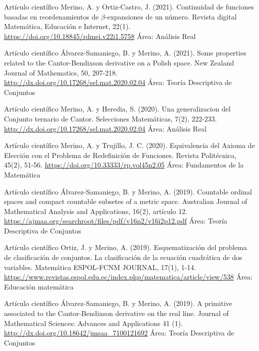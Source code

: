 \documentclass[
	a4paper,
	maincolor=cvblue!70!blue,
	sidecolor=gray!30,
	sectioncolor=cvblue!70!blue,
    sidebarwidth=7.5cm,
	topbottommargin=20pt,
	leftrightmargin=20pt,
]{fortysecondscv}
\begin{document}
    {Artículo científico}
    {Merino, A. y Ortiz-Castro, J. (2021). Continuidad de funciones basadas en reordenamientos de $\beta$-expansiones de un número. Revista digital Matemática, Educación e Internet, 22(1).}     
    {\url{https://doi.org/10.18845/rdmei.v22i1.5758}}
    {Área: Análisis Real}
    
    {Artículo científico}
    {Álvarez-Samaniego, B. y Merino, A. (2021). Some properties related to the Cantor-Bendixson derivative on a Polish space. New Zealand Journal of Mathematics, 50, 207-218.}     {\url{http://dx.doi.org/10.17268/sel.mat.2020.02.04}}
    {Área: Teoría Descriptiva de Conjuntos}
    
    {Artículo científico}
    {Merino, A. y Heredia, S. (2020). Una generalizacion del Conjunto ternario de Cantor. Selecciones Matemáticas, 7(2), 222-233.}     {\url{http://dx.doi.org/10.17268/sel.mat.2020.02.04}}
    {Área: Análisis Real}
    
    {Artículo científico}
    {Merino, A. y Trujillo, J. C. (2020). Equivalencia del Axioma de Elección con el Problema de Redefinición de Funciones. Revista Politécnica, 45(2), 51-56.}     {\url{https://doi.org/10.33333/rp.vol45n2.05}}
    {Área: Fundamentos de la Matemática}
    
    {Artículo científico}
    {Álvarez-Samaniego, B. y Merino, A. (2019). Countable ordinal spaces and compact countable subsetes of a metric space. Australian Journal of Mathematical Analysis and Applications, 16(2), artículo 12.}
    {\url{https://ajmaa.org/searchroot/files/pdf/v16n2/v16i2p12.pdf}}
    {Área: Teoría Descriptiva de Conjuntos}
    
    {Artículo científico}
    {Ortiz, J. y Merino, A. (2019). Esquematización del problema de clasificación de conjuntos. La clasificación de la ecuación cuadrática de dos variables. Matemática ESPOL-FCNM JOURNAL, 17(1), 1-14.}
    {\url{https://www.revistas.espol.edu.ec/index.php/matematica/article/view/538}}
    {Área: Educación matemática}
    
    {Artículo científico}
    {Álvarez-Samaniego, B. y Merino, A. (2019). A primitive associated to the Cantor-Bendixson derivative on the real line. Journal of Mathematical Sciences: Advances and Applications 41 (1).}     
    {\url{http://dx.doi.org/10.18642/jmsaa_7100121692}}
    {Área: Teoría Descriptiva de Conjuntos}
    
\end{document}
